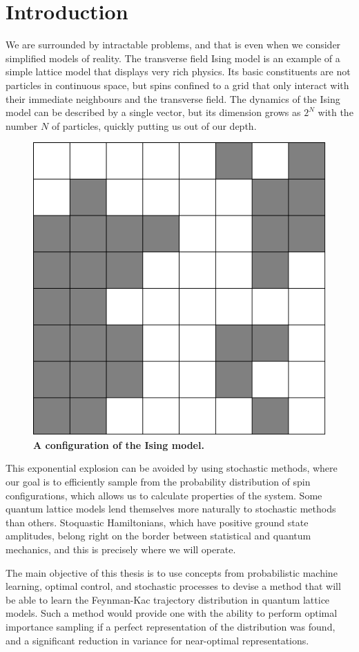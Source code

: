 
\chapter{Introduction}
\label{chapter1}

We are surrounded by intractable problems, and that is even when we consider simplified models of reality. The transverse field Ising model is an example of a simple lattice model that displays very rich physics. Its basic constituents are not particles in continuous space, but spins confined to a grid that only interact with their immediate neighbours and the transverse field. The dynamics of the Ising model can be described by a single vector, but its dimension grows as $2^N$ with the number $N$ of particles, quickly putting us out of our depth. 
\begin{figure}[h]
	\centering
	\includegraphics[width=0.25\linewidth]{Chapter1/ising_passive0}
	\caption[A configuration of the Ising model.]{\textbf{A configuration of the Ising model.}}
	\label{fig:isingpassive0}
\end{figure}
This exponential explosion can be avoided by using stochastic methods, where our goal is to efficiently sample from the probability distribution of spin configurations, which allows us to calculate properties of the system. Some quantum lattice models lend themselves more naturally to stochastic methods than others. Stoquastic Hamiltonians, which have positive ground state amplitudes, belong right on the border between statistical and quantum mechanics, and this is precisely where we will operate.

The main objective of this thesis is to use concepts from probabilistic machine learning, optimal control, and stochastic processes to devise a method that will be able to learn the Feynman-Kac trajectory distribution in quantum lattice models. Such a method would provide one with the ability to perform optimal importance sampling if a perfect representation of the distribution was found, and a significant reduction in variance for near-optimal representations. 

